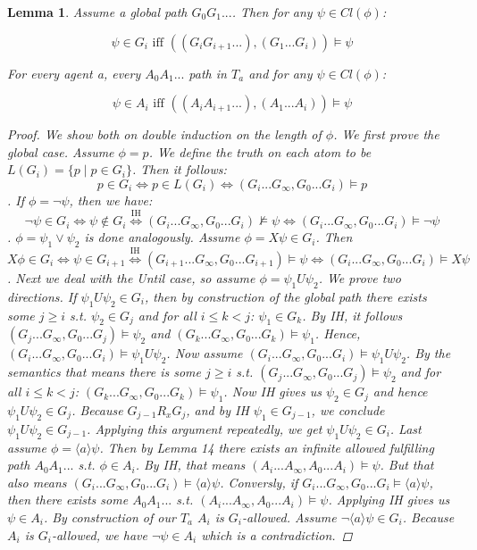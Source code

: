 \documentclass[11pt]{article}
\newtheorem{lemma}[theorem]{Lemma}
\theoremstyle{definition}
\theoremstyle{remark}
\begin{document}
\begin{lemma}
    Assume a global path $G_0G_1...$.  Then for any $\psi \in Cl(\phi)$:

    $$  \psi \in G_i \mbox{ iff } ((G_iG_{i+1}...), (G_1...G_i)) \vDash \psi    $$

    For every agent a, every $A_0A_1...$ path in $T_a$ and for any $\psi \in Cl(\phi)$:

    $$ \psi \in A_i \mbox{ iff } ((A_iA_{i+1}...), (A_1...A_i)) \vDash \psi    $$

    \begin{proof}
        We show both on double induction on the length of $\phi$. We first prove the global case.
        Assume $\phi = p$. We define the truth on each atom to be $L(G_i) = \{p \mid p \in G_i\}$.
        Then it follows: $$p \in G_i \iff p \in L(G_i) \iff (G_i...G_\infty, G_0...G_i) \vDash p$$. If $\phi = \neg \psi$,
        then we have: $$\neg \psi \in G_i \iff \psi \notin G_i \overset{\text{IH}}{\iff} (G_i...G_\infty, G_0...G_i) \nvDash \psi \iff (G_i...G_{\infty}, G_0...G_i) \vDash \neg\psi$$.
        $\phi = \psi_1 \lor \psi_2$ is done analogously. Assume $\phi =X \psi \in G_i$. Then $X \phi \in G_i \iff \psi \in G_{i+1} \overset{\text{IH}}{\iff} 
        (G_{i+1}...G_\infty, G_0...G_{i+1}) \vDash \psi  \iff (G_i...G_\infty, G_0... G_i) \vDash X \psi$.  \newline 
        Next we deal with the Until case, so assume $\phi = \psi_1 U \psi_2$. We prove two directions.
        If $\psi_1 U \psi_2 \in G_i$, then by construction of the global path there exists some $j \geq i$ s.t. $\psi_2 \in G_j$ and for all $i \leq k < j$: $\psi_1 \in G_k$. By IH, it follows
        $(G_j...G_\infty, G_0...G_j) \vDash \psi_2$ and $(G_k...G_\infty, G_0...G_k) \vDash \psi_1$. Hence, $(G_i...G_\infty, G_0...G_i) \vDash \psi_1 U \psi_2$.
        Now assume $(G_i...G_\infty, G_0...G_i) \vDash \psi_1 U \psi_2$. By the semantics that means there is some $j \geq i$ s.t. 
        $(G_j...G_\infty, G_0...G_j) \vDash \psi_2$ and for all $i \leq k < j$: $(G_k...G_\infty, G_0...G_k) \vDash \psi_1$. Now IH gives us
        $\psi_2 \in G_j$ and hence $\psi_1 U \psi_2 \in G_j$. Because $G_{j-1} R_x G_j$, and by IH $\psi_1 \in G_{j-1}$, we conclude $\psi_1 U \psi_2 \in G_{j-1}$. Applying this argument repeatedly, we get $\psi_1 U \psi_2 \in G_i$.
        \newline Last assume $\phi = \langle a \rangle \psi$. Then by Lemma 14 there exists an infinite allowed fulfilling path $A_0A_1...$ s.t. $\phi \in A_i$. By IH, that means $(A_i...A_\infty, A_0...A_i) \vDash \psi$.
        But that also means $(G_i...G_\infty, G_0...G_i) \vDash \langle a \rangle \psi$. Conversly, if $G_i...G_\infty, G_0...G_i \vDash \langle a \rangle \psi$,
        then there exists some $A_0A_1...$ s.t. $(A_i...A_\infty, A_0...A_i) \vDash \psi$. Applying IH gives us $\psi \in A_i$. By construction of our $T_a$ $A_i$ is $G_i$-allowed.
        Assume $\neg \langle a \rangle \psi \in G_i$. Because $A_i$ is $G_i$-allowed, we have $\neg \psi \in A_i$ which is a contradiction.



\end{proof}
\end{lemma}
\end{document}
